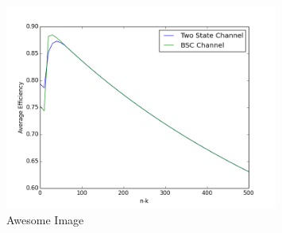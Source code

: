 \documentclass{article}
\begin{document}
\begin{figure}[H]
    \centering
    \includegraphics[width=0.8\textwidth]{q5.png}
    \caption{Awesome Image}
    \label{fig:awesome_image}
\end{figure}
\end{document}
